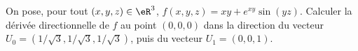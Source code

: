 
\begin{exercice}\label{exoOutilsMath-0087}

    On pose, pour tout \( (x,y,z)\in \eR^3\), \( f(x,y,z)=xy+ e^{xy}\sin(yz)\). Calculer la dérivée directionnelle de \( f\) au point \( (0,0,0)\) dans la direction du vecteur \( U_0=(1/\sqrt{3},1/\sqrt{3},1/\sqrt{3})\), puis du vecteur \( U_1=(0,0,1)\).

\end{exercice}
